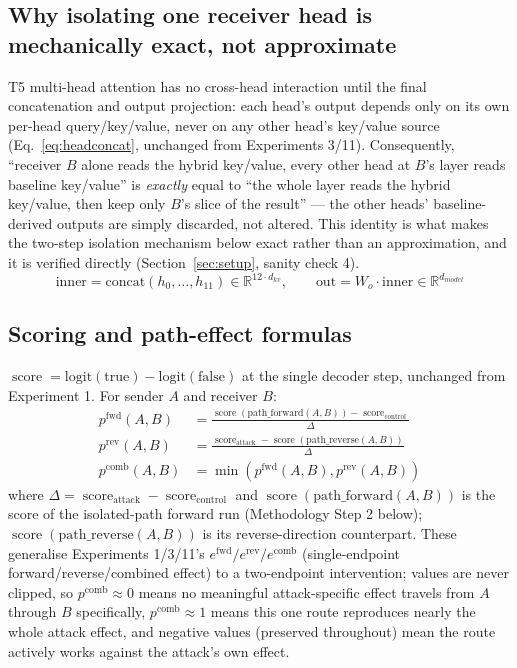 \documentclass[11pt]{article}
\newcommand{\fwd}{\ensuremath{e^{\mathrm{fwd}}}}
\newcommand{\rev}{\ensuremath{e^{\mathrm{rev}}}}
\newcommand{\score}{\operatorname{score}}
\newcommand{\comb}{\ensuremath{e^{\mathrm{comb}}}}
\newcommand{\pfwd}{\ensuremath{p^{\mathrm{fwd}}}}
\newcommand{\prev}{\ensuremath{p^{\mathrm{rev}}}}
\newcommand{\pcomb}{\ensuremath{p^{\mathrm{comb}}}}
\begin{document}
\subsection{Why isolating one receiver head is mechanically exact, not approximate}

T5 multi-head attention has no cross-head interaction until the final
concatenation and output projection: each head's output depends only on its
own per-head query/key/value, never on any other head's key/value source
(Eq.~\ref{eq:headconcat}, unchanged from Experiments 3/11). Consequently,
``receiver $B$ alone reads the hybrid key/value, every other head at $B$'s
layer reads baseline key/value'' is \emph{exactly} equal to ``the whole layer
reads the hybrid key/value, then keep only $B$'s slice of the result'' — the
other heads' baseline-derived outputs are simply discarded, not altered. This
identity is what makes the two-step isolation mechanism below exact rather
than an approximation, and it is verified directly (Section~\ref{sec:setup},
sanity check 4).
\begin{equation}
\text{inner} = \text{concat}(h_0, \dots, h_{11}) \in \mathbb{R}^{12 \cdot d_{kv}}, \qquad
\text{out} = W_o \cdot \text{inner} \in \mathbb{R}^{d_{model}}
\label{eq:headconcat}
\end{equation}

\subsection{Scoring and path-effect formulas}

$\score = \text{logit}(\text{true}) - \text{logit}(\text{false})$ at the
single decoder step, unchanged from Experiment 1. For sender $A$ and receiver
$B$:
\begin{align}
\pfwd(A,B) &= \frac{\score(\text{path\_forward}(A,B)) - \score_{\text{control}}}{\Delta} \label{eq:pfwd}\\
\prev(A,B) &= \frac{\score_{\text{attack}} - \score(\text{path\_reverse}(A,B))}{\Delta} \label{eq:prev}\\
\pcomb(A,B) &= \min(\pfwd(A,B), \prev(A,B)) \label{eq:pcomb}
\end{align}
where $\Delta = \score_{\text{attack}} - \score_{\text{control}}$ and
$\score(\text{path\_forward}(A,B))$ is the score of the isolated-path
forward run (Methodology Step 2 below); $\score(\text{path\_reverse}(A,B))$
is its reverse-direction counterpart. These generalise Experiments 1/3/11's
$\fwd/\rev/\comb$ (single-endpoint forward/reverse/combined effect) to a
two-endpoint intervention; values are never clipped, so $\pcomb \approx 0$
means no meaningful attack-specific effect travels from $A$ through $B$
specifically, $\pcomb \approx 1$ means this one route reproduces nearly the
whole attack effect, and negative values (preserved throughout) mean the
route actively works against the attack's own effect.
\end{document}

